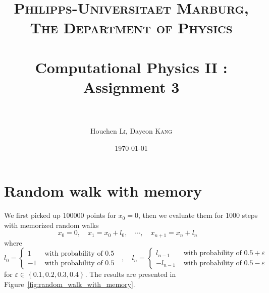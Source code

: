 \documentclass[paper=a4, fontsize=11pt]{scrartcl} %
\title{	
	\normalfont \normalsize 
	\textsc{Philipps-Universitaet Marburg, The Department of Physics} \\ [25pt] %
	\horrule{0.5pt} \\[0.4cm] %
	\huge Computational Physics II : Assignment 3 \\ %
	\horrule{2pt} \\[0.5cm] %
}
\author{Houchen \textsc{Li}, Dayeon \textsc{Kang}} %
\date{\normalsize\today} %
\numberwithin{equation}{section} %
\numberwithin{figure}{section} %
\numberwithin{table}{section} %
\begin{document}
\maketitle %


\section{Random walk with memory}

We first picked up 100000 points for \(x_0=0\), then we evaluate them for 1000 steps with memorized random walks
\begin{equation}
	x_0=0,\quad x_1=x_0+l_0,\quad\cdots,\quad x_{n+1}=x_n+l_n\quad
	\label{equ:memorized_random_walk:position}
\end{equation}
where
\begin{equation}
	l_0=\begin{cases}1 & \text{ with probability of \(0.5\) } \\ -1 & \text{ with probability of \(0.5\) }\end{cases},\quad l_n=\begin{cases}l_{n-1} & \text{ with probability of \(0.5+\varepsilon\) } \\ -l_{n-1} & \text{ with probability of \(0.5-\varepsilon\) }\end{cases}
	\label{equ:memorized_random_walk:step}
\end{equation}
for \(\varepsilon\in\left\{0.1,0.2,0.3,0.4\right\}\). The results are presented in Figure~\ref{fig:random_walk_with_memory}.\par
\end{document}
